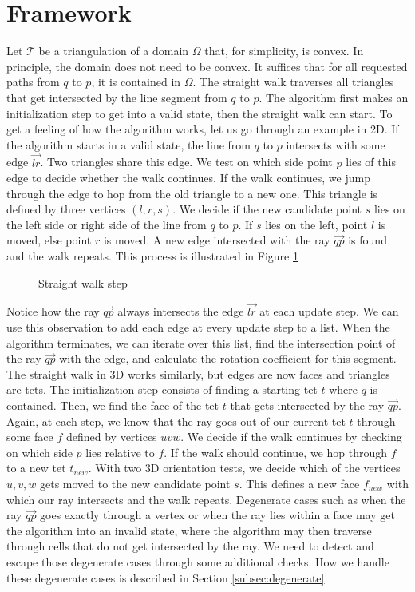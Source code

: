 \documentclass[../thesis.tex]{subfiles}
\begin{document}
\section{Framework}
\label{sec:framework}
Let $\mathcal{T}$ be a triangulation of a domain $\Omega$ that, for simplicity, is convex.
In principle, the domain does not need to be convex. It suffices that for all requested paths from $q$ to $p$,
it is contained in $\Omega$.
The straight walk traverses all triangles that get intersected by the line segment
from $q$ to $p$. The algorithm first makes an initialization step to get into a valid state, 
then the straight walk can start.
To get a feeling of how the algorithm works, let us go through an example in 2D.
If the algorithm starts in a valid state, the line from $q$ to $p$
intersects with some edge $\vec{lr}$. Two triangles share this edge.
We test on which side point $p$ lies of this edge to decide whether the walk continues.
If the walk continues, we jump through the edge to hop from the old triangle to a new one.
This triangle is defined by three vertices $(l,r,s)$. We decide if
the new candidate point $s$ lies on the left side or right side of the line from $q$ to $p$.
If $s$ lies on the left, point $l$ is moved, else point $r$ is moved.
A new edge intersected with the ray $\vec{qp}$ is found and the walk repeats.
This process is illustrated in Figure \ref{fig:straight-walk-2d}
\begin{figure}[htb]
  \centering
  \def\svgwidth{35em}
  
  \caption{Straight walk step}\label{fig:straight-walk-2d}        
\end{figure}
Notice how the ray $\vec{qp}$ always intersects the edge $\vec{lr}$ at each update step.
We can use this observation to add each edge at every update step to a list.
When the algorithm terminates, we can iterate over this list, find
the intersection point of the ray $\vec{qp}$ with the edge, and calculate the rotation
coefficient for this segment.
The straight walk in 3D works similarly, but edges are now faces and triangles are tets. The initialization step consists of finding a starting tet $t$
where $q$ is contained. Then, we find the face of the tet $t$ that gets intersected by the ray
$\vec{qp}$. Again, at each step, we know that the ray goes out of our current tet $t$ through some
face $f$ defined by vertices $uvw$. We decide if the walk continues by checking on which side $p$ lies relative to $f$.
If the walk should continue, we hop through $f$ to a new tet $t_{new}$. With two 3D orientation tests,
we decide which of the vertices $u, v, w$ gets moved to the new candidate point $s$. This defines
a new face $f_{new}$ with which our ray intersects and the walk repeats.
Degenerate cases such as when the ray $\vec{qp}$ goes exactly through a vertex or
when the ray lies within a face may get the algorithm into
an invalid state, where the algorithm may then traverse through
cells that do not get intersected by the ray. We need to detect and escape those degenerate cases
through some additional checks.
How we handle these degenerate cases is described in Section \ref{subsec:degenerate}.
\end{document}
